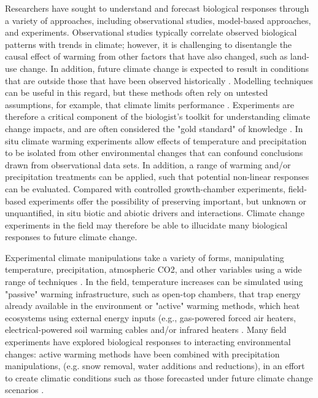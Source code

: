 \documentclass{article}
\begin{document}
\par Researchers have sought to understand and forecast biological responses through a variety of approaches, including observational studies, model-based approaches, and experiments. Observational studies typically correlate observed biological patterns with trends in climate; however, it is challenging to disentangle the causal effect of warming from other factors that have also changed, such as land-use change. In addition, future climate change is expected to result in conditions that are outside those that have been observed historically \citep{ohlemuller2006,williams2007,williams2007b,ipcc2013}. Modelling techniques can be useful in this regard, but these methods often rely on untested assumptions, for example, that climate limits performance \citep{pearson2004,ibanez2006,swab2012}. Experiments are therefore a critical component of the biologist's toolkit for understanding climate change impacts, and are often considered the "gold standard" of knowledge \citep[e.g.][]{box1978,gelman2014}. In situ climate warming experiments allow effects of temperature and  precipitation to be isolated from other  environmental changes that can confound conclusions drawn from observational data sets. In addition, a range of warming  and/or precipitation treatments can be applied, such that potential non-linear responses can be evaluated. Compared with controlled growth-chamber experiments, field-based experiments offer the possibility of preserving important, but unknown or unquantified, in situ biotic and abiotic drivers and interactions. Climate change experiments in the field may therefore be able to illucidate many biological responses to future climate change.
\par Experimental climate manipulations take a variety of forms, manipulating temperature, precipitation, atmospheric CO2, and other variables using a wide range of techniques \citep{shaver2000,aronson2009}. In the field, temperature increases can be simulated using "passive" warming infrastructure, such as open-top chambers, that trap energy already available in the environment or "active" warming methods, which heat ecosystems using external energy inputs (e.g., gas-powered forced air heaters, electrical-powered soil warming cables and/or infrared heaters \citep{shaver2000}. Many field experiments have explored biological responses to interacting environmental changes: active warming methods have been combined with  precipitation manipulations, (e.g. snow removal,  water additions and reductions), in  an  effort to create  climatic  conditions such  as  those  forecasted  under  future climate  change scenarios \citep{price1998,cleland2006,sherry2007,rollinson2012}.
\end{document}
